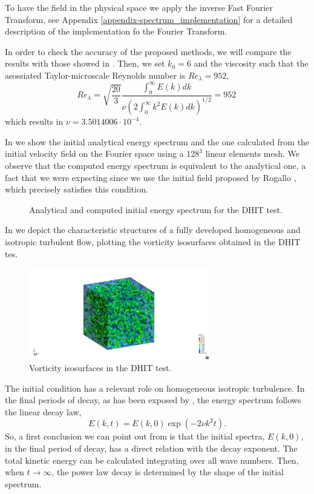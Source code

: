 To have the field  in the physical space we apply the inverse Fast Fourier Transform, see Appendix \ref{appendix-spectrum_implementation} for a detailed description of the implementation fo the Fourier Transform.

In order to check the accuracy of the proposed methods, we will compare the results with those showed in \cite{_selection_????}. Then, we set $k_0=6$ and the viscosity such that the asossiated Taylor-microscale Reynolds number is $Re_\lambda=952$,
$$Re_\lambda=\sqrt{\frac{20}{3}}\frac{\int_0^\infty E(k)dk}{\nu\left(2\int_0^\infty k^2E(k)dk\right)^{1/2}}=952\,$$
which results in $\nu=3.5014006\cdot 10^{-4}$.

In  we show the initial analytical energy spectrum and the one calculated from the initial velocity field on the Fourier space  using a $128^3$ linear elements mesh. We observe that the computed energy spectrum is equivalent to the analytical one, a fact that we were expecting since we use the initial field proposed by Rogallo \cite{rogallo_numerical_1981}, which precisely satisfies this condition.
\begin{figure}[h!]
	\centering	
	\caption{Analytical and computed initial energy spectrum for the DHIT test.}
	\label{fig-DHIT_initial_spectrum}
\end{figure}

In  we depict the characteristic structures of a fully developed homogeneous and isotropic turbulent flow, plotting the vorticity isosurfaces obtained in the DHIT tes.
\begin{figure}[h!]
	\centering	
	\includegraphics[trim=18cm 3.3cm 14cm 3.2cm,clip=true,width=0.7\textwidth]{Figures/Chapter3/DHIT_isovorticity}
	\caption{Vorticity isosurfaces in the DHIT test.}
	\label{fig-DHIT_isovorticity}
\end{figure}

The initial condition has a relevant role on homogeneous isotropic turbulence. In the final periods of decay, as has been exposed by \cite{hinze_turbulence_1975}, the energy spectrum follows the linear decay law,
\begin{equation}
\label{eq-DHIT_final_decay}
E(k,t)=E(k,0)\exp(-2\nu k^2t).
\end{equation}
So, a first conclusion we can point out from  is that the initial spectra, $E(k,0)$, in the final period of decay, has a direct relation with the decay exponent. The total kinetic energy can be calculated integrating  over all wave numbers. Then, when $t\rightarrow\infty$, the power law decay is determined by the shape of the initial spectrum.


